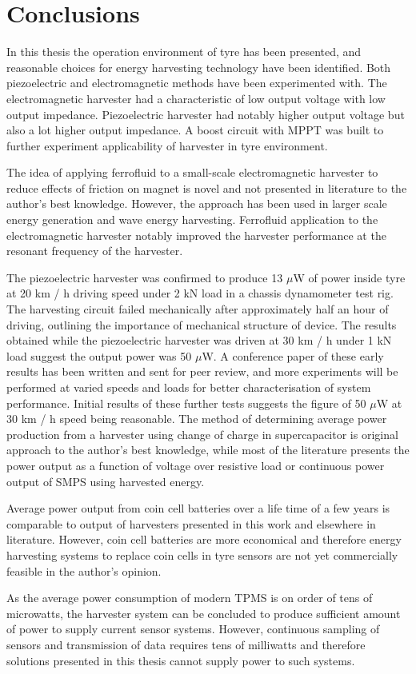 \section{Conclusions}\label{sect:conclusions}
In this thesis the operation environment of tyre has been presented, and reasonable choices for energy harvesting technology have been identified. Both piezoelectric and electromagnetic methods have been experimented with. The electromagnetic harvester had a characteristic of low output voltage with low output impedance. Piezoelectric harvester had notably higher output voltage but also a lot higher output impedance. A boost circuit with MPPT was built to further experiment applicability of harvester in tyre environment. 

The idea of applying ferrofluid to a small-scale electromagnetic harvester to reduce effects of friction on magnet is novel and not presented in literature to the author's best knowledge. However, the approach has been used in larger scale energy generation and wave energy harvesting. Ferrofluid application to the electromagnetic harvester notably improved the harvester performance at the resonant frequency of the harvester. 

The piezoelectric harvester was confirmed to produce 13 $\mu$W of power inside tyre at 20 km / h driving speed under 2 kN load in a chassis dynamometer test rig. The harvesting circuit failed mechanically after approximately half an hour of driving, outlining the importance of mechanical structure of device. The results obtained while the piezoelectric harvester was driven at 30 km / h under 1 kN load suggest the output power was 50 $\mu$W. A conference paper of these early results has been written and sent for peer review, and more experiments will be performed at varied speeds and loads for better characterisation of system performance. Initial results of these further tests suggests the figure of 50 $\mu$W at 30 km / h speed being reasonable. The method of determining average power production from a harvester using change of charge in supercapacitor is original approach to the author's best knowledge, while most of the literature presents the power output as a function of voltage over resistive load or continuous power output of SMPS using harvested energy.  

Average power output from coin cell batteries over a life time of a few years is comparable to output of harvesters presented in this work and elsewhere in literature. However, coin cell batteries are more economical and therefore energy harvesting systems to replace coin cells in tyre sensors are not yet commercially feasible in the author's opinion.

As the average power consumption of modern TPMS is on order of tens of microwatts, the harvester system can be concluded to produce sufficient amount of power to supply current sensor systems. However, continuous sampling of sensors and transmission of data requires tens of milliwatts and therefore solutions presented in this thesis cannot supply power to such systems. 
